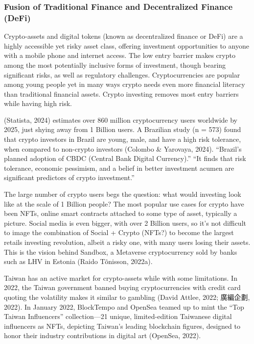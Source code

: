 \documentclass[
  12pt,
  letterpaper,
  DIV=11,
  numbers=noendperiod]{scrartcl}
\begin{document}
\subsubsection{Fusion of Traditional Finance and Decentralized Finance
(DeFi)}\label{fusion-of-traditional-finance-and-decentralized-finance-defi}

Crypto-assets and digital tokens (known as decentralized finance or
DeFi) are a highly accessible yet risky asset class, offering investment
opportunities to anyone with a mobile phone and internet access. The low
entry barrier makes crypto among the most potentially inclusive forms of
investment, though bearing significant risks, as well as regulatory
challenges. Cryptocurrencies are popular among young people yet in many
ways crypto needs even more financial literacy than traditional
financial assets. Crypto investing removes most entry barriers while
having high risk.

(Statista, 2024) estimates over 860 million cryptocurrency users
worldwide by 2025, just shying away from 1 Billion users. A Brazilian
study (n = 573) found that crypto investors in Brazil are young, male,
and have a high risk tolerance, when compared to non-crypto investors
(Colombo \& Yarovaya, 2024). ``Brazil's planned adoption of CBDC
(Central Bank Digital Currency).'' ``It finds that risk tolerance,
economic pessimism, and a belief in better investment acumen are
significant predictors of crypto investment.''

The large number of crypto users begs the question: what would investing
look like at the scale of 1 Billion people? The most popular use cases
for crypto have been NFTs, online smart contracts attached to some type
of asset, typically a picture. Social media is even bigger, with over 2
Billion users, so it's not difficult to image the combination of Social
+ Crypto (NFTs?) to become the largest retails investing revolution,
albeit a risky one, with many users losing their assets. This is the
vision behind Sandbox, a Metaverse cryptocurrency sold by banks such as
LHV in Estonia (Raido Tõnisson, 2022a).

Taiwan has an active market for crypto-assets while with some
limitations. In 2022, the Taiwan government banned buying
cryptocurrencies with credit card quoting the volatility makes it
similar to gambling (David Attlee, 2022; 廣編企劃, 2022). In January
2022, BlockTempo and OpenSea teamed up to mint the ``Top Taiwan
Influencers'' collection---21 unique, limited-edition Taiwanese digital
influencers as NFTs, depicting Taiwan's leading blockchain figures,
designed to honor their industry contributions in digital art (OpenSea,
2022).
\end{document}
